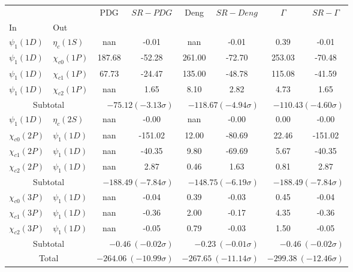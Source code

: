 \begin{tabular}{|l|l|c|c|c|c|c|c|}%
\hline%
&&PDG&$SR-PDG$&Deng&$SR-Deng$&$\Gamma$&$SR-\Gamma$\\%
In&Out&&&&&&\\%
\hline%
$\psi_{1}(1D)$&$\eta_{c}(1S)$&nan&-0.01&nan&-0.01&0.39&-0.01\\%
$\psi_{1}(1D)$&$\chi_{c0}(1P)$&187.68&-52.28&261.00&-72.70&253.03&-70.48\\%
$\psi_{1}(1D)$&$\chi_{c1}(1P)$&67.73&-24.47&135.00&-48.78&115.08&-41.59\\%
$\psi_{1}(1D)$&$\chi_{c2}(1P)$&nan&1.65&8.10&2.82&4.73&1.65\\%
\hline%
\hline%
\multicolumn{2}{|c|}{Subtotal}&\multicolumn{2}{|r|}{$-75.12 (-3.13\sigma)$}&\multicolumn{2}{|r|}{$-118.67 (-4.94\sigma)$}&\multicolumn{2}{|r|}{$-110.43 (-4.60\sigma)$}\\%
\hline%
\hline%
$\psi_{1}(1D)$&$\eta_{c}(2S)$&nan&-0.00&nan&-0.00&0.00&-0.00\\%
$\chi_{c0}(2P)$&$\psi_{1}(1D)$&nan&-151.02&12.00&-80.69&22.46&-151.02\\%
$\chi_{c1}(2P)$&$\psi_{1}(1D)$&nan&-40.35&9.80&-69.69&5.67&-40.35\\%
$\chi_{c2}(2P)$&$\psi_{1}(1D)$&nan&2.87&0.46&1.63&0.81&2.87\\%
\hline%
\hline%
\multicolumn{2}{|c|}{Subtotal}&\multicolumn{2}{|r|}{$-188.49 (-7.84\sigma)$}&\multicolumn{2}{|r|}{$-148.75 (-6.19\sigma)$}&\multicolumn{2}{|r|}{$-188.49 (-7.84\sigma)$}\\%
\hline%
\hline%
$\chi_{c0}(3P)$&$\psi_{1}(1D)$&nan&-0.04&0.39&-0.03&0.45&-0.04\\%
$\chi_{c1}(3P)$&$\psi_{1}(1D)$&nan&-0.36&2.00&-0.17&4.35&-0.36\\%
$\chi_{c2}(3P)$&$\psi_{1}(1D)$&nan&-0.05&0.79&-0.03&1.50&-0.05\\%
\hline%
\hline%
\multicolumn{2}{|c|}{Subtotal}&\multicolumn{2}{|r|}{$-0.46~(-0.02\sigma)$}&\multicolumn{2}{|r|}{$-0.23~(-0.01\sigma)$}&\multicolumn{2}{|r|}{$-0.46~(-0.02\sigma)$}\\%
\hline%
\hline%
\multicolumn{2}{|c|}{Total}&\multicolumn{2}{|r|}{$-264.06~(-10.99\sigma)$}&\multicolumn{2}{|r|}{$-267.65~(-11.14\sigma)$}&\multicolumn{2}{|r|}{$-299.38~(-12.46\sigma)$}\\%
\hline%
\end{tabular}